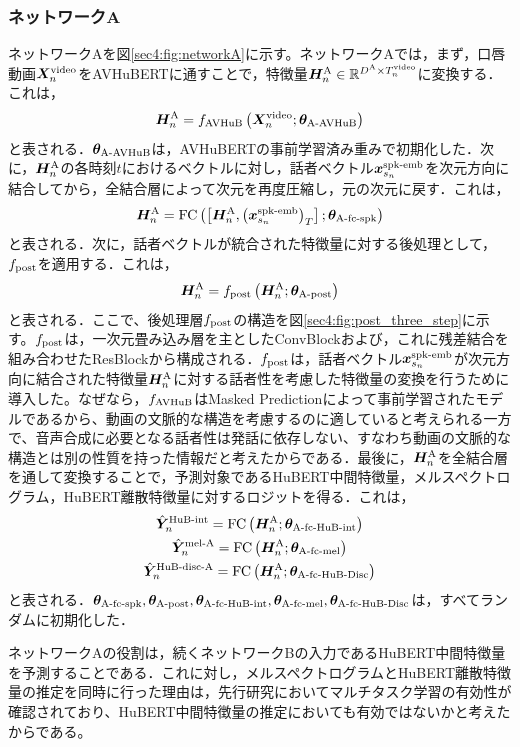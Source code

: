 \subsubsection{ネットワークA}
ネットワークAを図\ref{sec4:fig:networkA}に示す。ネットワークAでは，まず，口唇動画$\bm{X}^{\text{video}}_{n}$をAVHuBERTに通すことで，特徴量$\bm{H}^{\text{A}}_{n} \in \mathbb{R}^{D^{\text{A}} \times T^{\text{video}}_{n}}$に変換する．これは，
\begin{equation}
    \bm{H}^{\text{A}}_{n} = f_{\text{AVHuB}}\left(\bm{X}^{\text{video}}_{n}; \bm{\theta}_{\text{A-AVHuB}}\right)
\end{equation}
と表される．$\bm{\theta}_{\text{A-AVHuB}}$は，AVHuBERTの事前学習済み重みで初期化した．次に，$\bm{H}^{\text{A}}_{n}$の各時刻$t$におけるベクトルに対し，話者ベクトル$\bm{x}^{\text{spk-emb}}_{s_{n}}$を次元方向に結合してから，全結合層によって次元を再度圧縮し，元の次元に戻す．これは，
\begin{equation}
    \bm{H}^{\text{A}}_{n} = \text{FC}\left(\left[\bm{H}^{\text{A}}_{n}, \left(\bm{x}^{\text{spk-emb}}_{s_{n}}\right)_{T}\right]; \bm{\theta}_{\text{A-fc-spk}}\right)
\end{equation}
と表される．次に，話者ベクトルが統合された特徴量に対する後処理として，$f_{\text{post}}$を適用する．これは，
\begin{equation}
    \bm{H}^{\text{A}}_{n} = f_{\text{post}}\left(\bm{H}^{\text{A}}_{n}; \bm{\theta}_{\text{A-post}}\right)
\end{equation}
と表される．ここで、後処理層$f_{\text{post}}$の構造を図\ref{sec4:fig:post_three_step}に示す。$f_{\text{post}}$は，一次元畳み込み層を主としたConvBlockおよび，これに残差結合を組み合わせたResBlockから構成される．$f_{\text{post}}$は，話者ベクトル$\bm{x}^{\text{spk-emb}}_{s_{n}}$が次元方向に結合された特徴量$\bm{H}^{\text{A}}_{n}$に対する話者性を考慮した特徴量の変換を行うために導入した。なぜなら，$f_{\text{AVHuB}}$はMasked Predictionによって事前学習されたモデルであるから、動画の文脈的な構造を考慮するのに適していると考えられる一方で、音声合成に必要となる話者性は発話に依存しない、すなわち動画の文脈的な構造とは別の性質を持った情報だと考えたからである．最後に，$\bm{H}^{\text{A}}_{n}$を全結合層を通して変換することで，予測対象であるHuBERT中間特徴量，メルスペクトログラム，HuBERT離散特徴量に対するロジットを得る．これは，
\begin{gather}
    \hat{\bm{Y}}^{\text{HuB-int}}_{n} = \text{FC}\left(\bm{H}^{\text{A}}_{n}; \bm{\theta}_{\text{A-fc-HuB-int}}\right) \\
    \hat{\bm{Y}}^{\text{mel-A}}_{n} = \text{FC}\left(\bm{H}^{\text{A}}_{n}; \bm{\theta}_{\text{A-fc-mel}}\right) \\
    \hat{\bm{Y}}^{\text{HuB-disc-A}}_{n} = \text{FC}\left(\bm{H}^{\text{A}}_{n}; \bm{\theta}_{\text{A-fc-HuB-Disc}}\right)
\end{gather}
と表される．$\bm{\theta}_{\text{A-fc-spk}}, \bm{\theta}_{\text{A-post}}, \bm{\theta}_{\text{A-fc-HuB-int}}, \bm{\theta}_{\text{A-fc-mel}}, \bm{\theta}_{\text{A-fc-HuB-Disc}}$は，すべてランダムに初期化した．

ネットワークAの役割は，続くネットワークBの入力であるHuBERT中間特徴量を予測することである．これに対し，メルスペクトログラムとHuBERT離散特徴量の推定を同時に行った理由は，先行研究\cite{kim2023lip_multitask,choi2023intelligible}においてマルチタスク学習の有効性が確認されており、HuBERT中間特徴量の推定においても有効ではないかと考えたからである。

